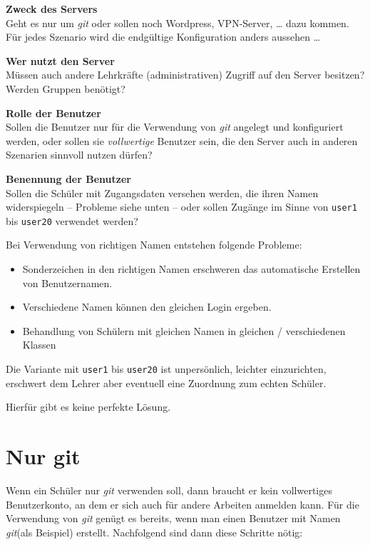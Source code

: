 \documentclass[
  letterpaper,
  DIV=11]{scrreprt}
\providecommand{\tightlist}{%
  \setlength{\itemsep}{0pt}\setlength{\parskip}{0pt}}\usepackage{longtable,booktabs,array}
\newcommand{\git}{\textit{git}\xspace}
\begin{document}
\textbf{Zweck des Servers}\\
Geht es nur um \git oder sollen noch Wordpress, VPN-Server, \ldots{}
dazu kommen. Für jedes Szenario wird die endgültige Konfiguration anders
aussehen \ldots{}

\textbf{Wer nutzt den Server}\\
Müssen auch andere Lehrkräfte (administrativen) Zugriff auf den Server
besitzen? Werden Gruppen benötigt?

\textbf{Rolle der Benutzer}\\
Sollen die Benutzer nur für die Verwendung von \git angelegt und
konfiguriert werden, oder sollen sie \emph{vollwertige} Benutzer sein,
die den Server auch in anderen Szenarien sinnvoll nutzen dürfen?

\textbf{Benennung der Benutzer}\\
Sollen die Schüler mit Zugangsdaten versehen werden, die ihren Namen
widerspiegeln -- Probleme siehe unten -- oder sollen Zugänge im Sinne
von \texttt{user1} bis \texttt{user20} verwendet werden?

Bei Verwendung von richtigen Namen entstehen folgende Probleme:

\begin{itemize}
\tightlist
\item
  Sonderzeichen in den richtigen Namen erschweren das automatische
  Erstellen von Benutzernamen.
\item
  Verschiedene Namen können den gleichen Login ergeben.
\item
  Behandlung von Schülern mit gleichen Namen in gleichen / verschiedenen
  Klassen
\end{itemize}

Die Variante mit \texttt{user1} bis \texttt{user20} ist unpersönlich,
leichter einzurichten, erschwert dem Lehrer aber eventuell eine
Zuordnung zum echten Schüler.

Hierfür gibt es keine perfekte Lösung.

\section{Nur git}\label{nur-git}

Wenn ein Schüler nur \git verwenden soll, dann braucht er kein
vollwertiges Benutzerkonto, an dem er sich auch für andere Arbeiten
anmelden kann. Für die Verwendung von \git genügt es bereits, wenn man
einen Benutzer mit Namen \git (als Beispiel) erstellt. Nachfolgend sind
dann diese Schritte nötig:
\end{document}
